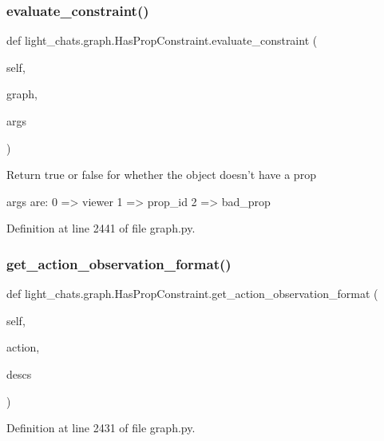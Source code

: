 \subsubsection{\texorpdfstring{evaluate\+\_\+constraint()}{evaluate\_constraint()}}
{\footnotesize\ttfamily def light\+\_\+chats.\+graph.\+Has\+Prop\+Constraint.\+evaluate\+\_\+constraint (\begin{DoxyParamCaption}\item[{}]{self,  }\item[{}]{graph,  }\item[{}]{args }\end{DoxyParamCaption})}

\begin{DoxyVerb}Return true or false for whether the object doesn't have a prop

args are:
    0 => viewer
    1 => prop_id
    2 => bad_prop
\end{DoxyVerb}
 

Definition at line 2441 of file graph.\+py.

\mbox{\label{classlight__chats_1_1graph_1_1HasPropConstraint_a306f2581a6d32cec3edd07fda539429a}} 
\subsubsection{\texorpdfstring{get\+\_\+action\+\_\+observation\+\_\+format()}{get\_action\_observation\_format()}}
{\footnotesize\ttfamily def light\+\_\+chats.\+graph.\+Has\+Prop\+Constraint.\+get\+\_\+action\+\_\+observation\+\_\+format (\begin{DoxyParamCaption}\item[{}]{self,  }\item[{}]{action,  }\item[{}]{descs }\end{DoxyParamCaption})}



Definition at line 2431 of file graph.\+py.



